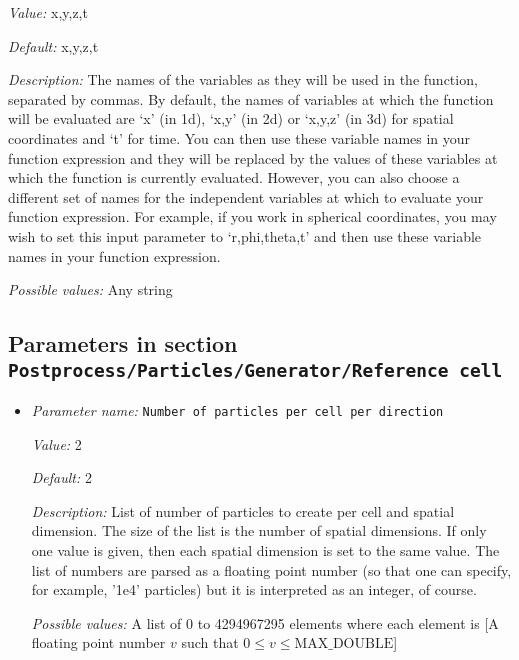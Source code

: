 \begin{itemize}
{\it Value:} x,y,z,t


{\it Default:} x,y,z,t


{\it Description:} The names of the variables as they will be used in the function, separated by commas. By default, the names of variables at which the function will be evaluated are `x' (in 1d), `x,y' (in 2d) or `x,y,z' (in 3d) for spatial coordinates and `t' for time. You can then use these variable names in your function expression and they will be replaced by the values of these variables at which the function is currently evaluated. However, you can also choose a different set of names for the independent variables at which to evaluate your function expression. For example, if you work in spherical coordinates, you may wish to set this input parameter to `r,phi,theta,t' and then use these variable names in your function expression.


{\it Possible values:} Any string
\end{itemize}

\subsection{Parameters in section \tt Postprocess/Particles/Generator/Reference cell}
\label{parameters:Postprocess/Particles/Generator/Reference_20cell}

\begin{itemize}
\item {\it Parameter name:} {\tt Number of particles per cell per direction}
\label{parameters:Postprocess/Particles/Generator/Reference cell/Number of particles per cell per direction}
\label{parameters:Postprocess/Particles/Generator/Reference_20cell/Number_20of_20particles_20per_20cell_20per_20direction}


{\it Value:} 2


{\it Default:} 2


{\it Description:} List of number of particles to create per cell and spatial dimension. The size of the list is the number of spatial dimensions. If only one value is given, then each spatial dimension is set to the same value. The list of numbers are parsed as a floating point number (so that one can specify, for example, '1e4' particles) but it is interpreted as an integer, of course.


{\it Possible values:} A list of 0 to 4294967295 elements where each element is [A floating point number $v$ such that $0 \leq v \leq \text{MAX\_DOUBLE}$]
\end{itemize}

